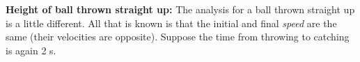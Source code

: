 \documentclass{handout}
\begin{document}
\begin{questions}
    \question \textbf{Height of ball thrown straight up:} The analysis for a ball thrown straight up is a little different. All that is known is that the initial and final \textit{speed} are the same (their velocities are opposite). Suppose the time from throwing to catching is again 2 s.
\end{questions}
\end{document}
